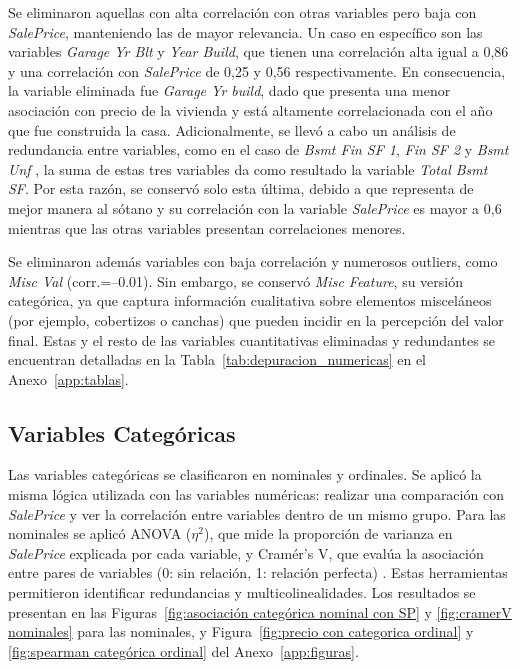 Se eliminaron aquellas con alta correlación con otras variables pero baja con \textit{SalePrice}, manteniendo las de mayor relevancia.
Un caso en específico son las variables \textit{Garage Yr Blt} y \textit{Year Build}, que tienen una correlación alta igual a 0,86 y una correlación con \textit{SalePrice} de 0,25 y 0,56 respectivamente. En consecuencia, la variable eliminada fue \textit{Garage Yr build}, dado que presenta una menor asociación con precio de la vivienda y está altamente correlacionada con el año que fue construida la casa. Adicionalmente, se llevó a cabo un análisis de redundancia entre variables, como en el caso de  \textit{Bsmt Fin SF 1}, \textit{Fin SF 2} y \textit{Bsmt Unf }, la suma de estas tres variables da como resultado la variable \textit{Total Bsmt SF}. Por esta razón, se conservó solo esta última, debido a que representa de mejor manera al sótano y su correlación con la variable \textit{SalePrice} es mayor a 0,6 mientras que las otras variables presentan correlaciones menores.

Se eliminaron además variables con baja correlación y numerosos outliers, como \textit{Misc Val} (corr.=–0.01). Sin embargo, se conservó \textit{Misc Feature}, su versión categórica, ya que captura información cualitativa sobre elementos misceláneos (por ejemplo, cobertizos o canchas) que pueden incidir en la percepción del valor final. Estas y el resto de las variables cuantitativas eliminadas y redundantes se encuentran detalladas en la Tabla~\ref{tab:depuracion_numericas} en el Anexo~\ref{app:tablas}.  

\subsection{Variables Categóricas \label{sec:sub2}}

Las variables categóricas se clasificaron en nominales y ordinales. Se aplicó la misma lógica utilizada con las variables numéricas: realizar una comparación con \textit{SalePrice} y ver la correlación entre variables dentro de un mismo grupo. 
Para las nominales se aplicó ANOVA ($\eta^2$), que mide la proporción de varianza en \textit{SalePrice} explicada por cada variable, y Cramér’s V, que evalúa la asociación entre pares de variables (0: sin relación, 1: relación perfecta) \cite{datascience2023}. Estas herramientas permitieron identificar redundancias y multicolinealidades. Los resultados se presentan en las Figuras~\ref{fig:asociación categórica nominal con SP} y \ref{fig:cramerV nominales} para las nominales, y Figura~\ref{fig:precio con categorica ordinal} y \ref{fig:spearman categórica ordinal}  del Anexo~\ref{app:figuras}.  

